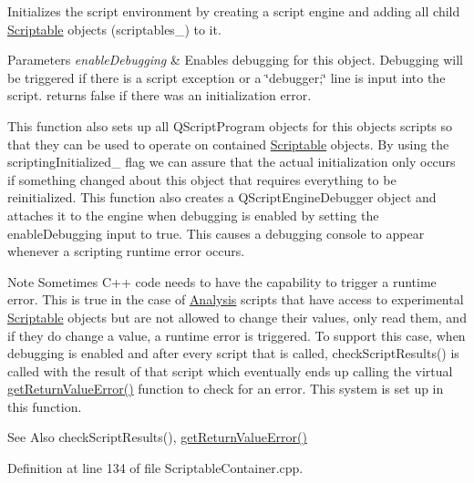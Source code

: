 Initializes the script environment by creating a script engine and adding all child \hyperlink{class_picto_1_1_scriptable}{Scriptable} objects (scriptables\-\_\-) to it.


\begin{DoxyParams}{Parameters}
{\em enable\-Debugging} & Enables debugging for this object. Debugging will be triggered if there is a script exception or a \char`\"{}debugger;\char`\"{} line is input into the script. returns false if there was an initialization error.\\
\hline
\end{DoxyParams}
This function also sets up all Q\-Script\-Program objects for this objects scripts so that they can be used to operate on contained \hyperlink{class_picto_1_1_scriptable}{Scriptable} objects. By using the scripting\-Initialized\-\_\- flag we can assure that the actual initialization only occurs if something changed about this object that requires everything to be reinitialized. This function also creates a Q\-Script\-Engine\-Debugger object and attaches it to the engine when debugging is enabled by setting the enable\-Debugging input to true. This causes a debugging console to appear whenever a scripting runtime error occurs.

\begin{DoxyNote}{Note}
Sometimes C++ code needs to have the capability to trigger a runtime error. This is true in the case of \hyperlink{class_picto_1_1_analysis}{Analysis} scripts that have access to experimental \hyperlink{class_picto_1_1_scriptable}{Scriptable} objects but are not allowed to change their values, only read them, and if they do change a value, a runtime error is triggered. To support this case, when debugging is enabled and after every script that is called, check\-Script\-Results() is called with the result of that script which eventually ends up calling the virtual \hyperlink{class_picto_1_1_scriptable_container_a1e0264aee7ce551d450dc07a6b369d56}{get\-Return\-Value\-Error()} function to check for an error. This system is set up in this function. 
\end{DoxyNote}
\begin{DoxySeeAlso}{See Also}
check\-Script\-Results(), \hyperlink{class_picto_1_1_scriptable_container_a1e0264aee7ce551d450dc07a6b369d56}{get\-Return\-Value\-Error()} 
\end{DoxySeeAlso}


Definition at line 134 of file Scriptable\-Container.\-cpp.

